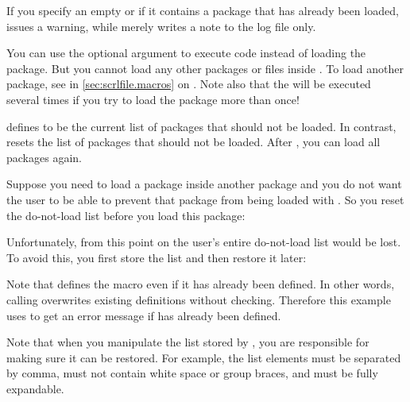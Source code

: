 If you specify an empty  or if it contains a package that
has already been loaded,  issues a warning,
while 
merely writes a note to the log file only.

You can use the optional argument to
execute code instead of loading the package. But you cannot load any other
packages or files inside . To load another package, see
 in \autoref{sec:scrlfile.macros} on
. Note also that the
 will be executed several times if you try to load the
package more than once!%
\EndIndexGroup


\begin{Declaration}
\end{Declaration}
defines  to be the current list of packages that should not be
loaded. In contrast,
resets the list of packages that should not be loaded. After
, you can load all packages again.
\begin{Example}
  Suppose you need to load a package inside another package and you do not
  want the user to be able to prevent that package from being loaded with
  . So you reset the do-not-load list
  before you load this package:
\begin{lstcode}
  \ResetPreventPackageFromLoading
  \RequirePackage{foo}
\end{lstcode}
  Unfortunately, from this point on the user's entire do-not-load list would
  be lost. To avoid this, you first store the list and then restore it later:
\begin{lstcode}
  \newcommand*{\Users@PreventList}{}%
  \StorePreventPackageFromLoading\Users@PreventList
  \ResetPreventPackageFromLoading
  \RequirePackage{foo}
  \PreventPackageFromLoading{\Users@PreventList}
\end{lstcode}
  Note that 
  defines the  macro even if it has already been
  defined. In other words, calling 
  overwrites existing  definitions without checking. Therefore
  this example uses  to get an error message if
   has already been defined.
\end{Example}
Note that when you manipulate the list stored by
, you are responsible for making sure it
can be restored. For example, the list elements must be separated by comma,
must not contain white space or group braces, and must be fully expandable.

